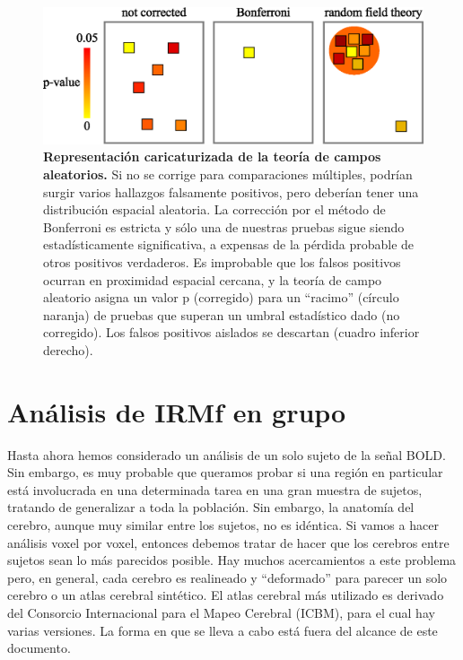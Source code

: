 \documentclass[12pt,a5,twoside]{book}
\begin{document}
\begin{figure}
	\centering
    \includegraphics [scale=0.7,center] {RFT.eps}
    \caption{\textbf{Representación caricaturizada de la teoría de campos aleatorios.} Si no se corrige para comparaciones múltiples, podrían surgir varios hallazgos falsamente positivos, pero deberían tener una distribución espacial aleatoria. La corrección por el método de Bonferroni es estricta y sólo una de nuestras pruebas sigue siendo estadísticamente significativa, a expensas de la pérdida probable de otros positivos verdaderos. Es improbable que los falsos positivos ocurran en proximidad espacial cercana, y la teoría de campo aleatorio asigna un valor p (corregido) para un ``racimo'' (círculo naranja) de pruebas que superan un umbral estadístico dado (no corregido). Los falsos positivos aislados se descartan (cuadro inferior derecho).}
    \label{F:RFT}
\end{figure}

\section{Análisis de IRMf en grupo}

Hasta ahora hemos considerado un análisis de un solo sujeto de la señal BOLD. Sin embargo, es muy probable que queramos probar si una región en particular está involucrada en una determinada tarea en una gran muestra de sujetos, tratando de generalizar a toda la población. Sin embargo, la anatomía del cerebro, aunque muy similar entre los sujetos, no es idéntica. Si vamos a hacer análisis voxel por voxel, entonces debemos tratar de hacer que los cerebros entre sujetos sean lo más parecidos posible. Hay muchos acercamientos a este problema pero, en general, cada cerebro es realineado y ``deformado'' para parecer un solo cerebro o un atlas cerebral sintético. El atlas cerebral más utilizado es derivado del Consorcio Internacional para el Mapeo Cerebral (ICBM), para el cual hay varias versiones. La forma en que se lleva a cabo está fuera del alcance de este documento.
\end{document}
